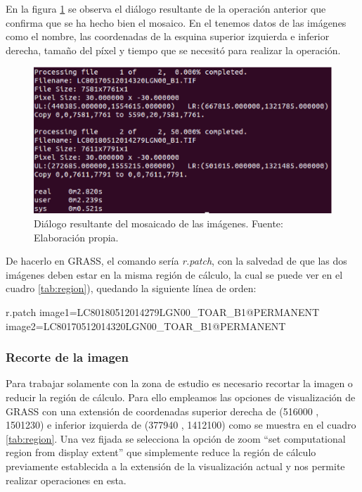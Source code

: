 En la figura \ref{fig:dialogomosaico} se observa el diálogo resultante de la operación anterior que confirma que se ha hecho bien el mosaico. En el tenemos datos de las imágenes como el nombre, las coordenadas de la esquina superior izquierda e inferior derecha, tamaño del píxel y tiempo que se necesitó para realizar la operación.\Sep

\begin{figure}
	\centering
	\includegraphics[width=0.8\linewidth]{./Imagenes/Dialogo_mosaico.eps}
	\caption[Diálogo del mosaicado]{Diálogo resultante del mosaicado de las imágenes. Fuente: Elaboración propia.}
	\label{fig:dialogomosaico}
\end{figure}

De hacerlo en GRASS, el comando sería \textit{r.patch}, con la salvedad de que las dos imágenes deben estar en la misma región de cálculo, la cual se puede ver en el cuadro \ref{tab:region}), quedando la siguiente línea de orden:\SmallSep

\begin{center}
\begin{boxedverbatim}
	r.patch image1=LC80180512014279LGN00_TOAR_B1@PERMANENT
	image2=LC80170512014320LGN00_TOAR_B1@PERMANENT
\end{boxedverbatim}
\end{center}

\subsubsection{Recorte de la imagen}
Para trabajar solamente con la zona de estudio es necesario recortar la imagen o reducir la región de cálculo. Para ello empleamos las opciones de visualización de GRASS con una extensión de coordenadas superior derecha de (516000 , 1501230) e inferior izquierda de (377940 , 1412100) como se muestra en el cuadro \ref{tab:region}. Una vez fijada se selecciona la opción de zoom ``set computational region from display extent'' que simplemente reduce la región de cálculo previamente establecida a la extensión de la visualización actual y nos permite realizar operaciones en esta.\Sep

